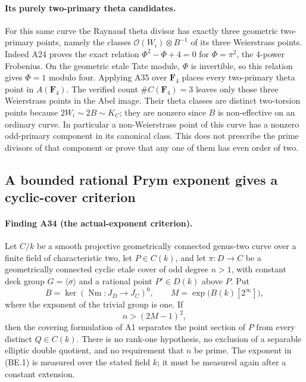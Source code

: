 \documentclass[11pt,a4paper]{article}
\begin{document}
\paragraph{Its purely two-primary theta candidates.}
For this same curve the Raynaud theta divisor has exactly three
geometric two-primary points, namely the classes
$\mathcal O(W_i)\otimes B^{-1}$ of its three Weierstrass points.
Indeed A24 proves the exact relation
$\Phi^2-\Phi+4=0$ for $\Phi=\pi^2$, the $4$-power Frobenius.
On the geometric etale Tate module, $\Phi$ is invertible, so
this relation gives $\Phi=1$ modulo four. Applying A35 over
$\mathbf F_4$ places every two-primary theta point in
$A(\mathbf F_4)$. The verified count
$\#C(\mathbf F_4)=3$ leaves only those three Weierstrass
points in the Abel image. Their theta classes are distinct
two-torsion points because $2W_i\sim2B\sim K_C$; they are
nonzero since $B$ is non-effective on an ordinary curve.
In particular a non-Weierstrass point of this curve has a
nonzero odd-primary component in its canonical class. This
does not prescribe the prime divisors of that component or
prove that any one of them has even order of two.


\subsection{A bounded rational Prym exponent gives a cyclic-cover criterion}
\label{sec:bounded-prym-exponent}

\paragraph{Finding A34 (the actual-exponent criterion).}
Let $C/k$ be a smooth projective geometrically connected genus-two
curve over a finite field of characteristic two, let $P\in C(k)$,
and let $\pi:D\to C$ be a geometrically connected cyclic etale cover
of odd degree $n>1$, with constant deck group
$G=\langle\sigma\rangle$ and a rational point $P'\in D(k)$ above $P$.
Put
\[
 B=\ker(\operatorname{Nm}:J_D\longrightarrow J_C)^0,
 \qquad M=\exp\bigl(B(k)[2^\infty]\bigr),
 \tag{BE.1}
\]
where the exponent of the trivial group is one. If
\[
                         n>(2M-1)^2,
 \tag{BE.2}
\]
then the covering formulation of A1 separates the point section
of $P$ from every distinct $Q\in C(k)$.
There is no rank-one hypothesis, no exclusion of a separable
elliptic double quotient, and no requirement that $n$ be prime.
The exponent in (BE.1) is measured over the stated field $k$;
it must be measured again after a constant extension.
\end{document}
